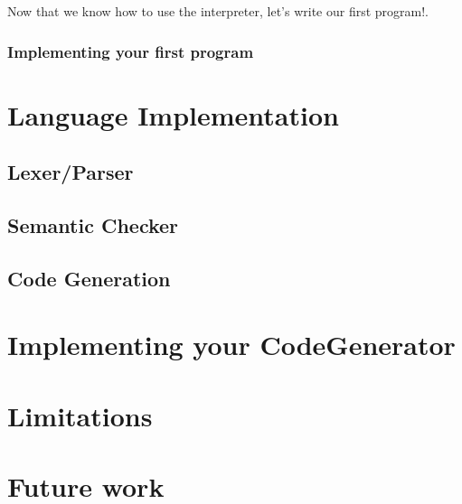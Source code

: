 Now that we know how to use the interpreter, let's write our first program!.

\subsubsection{Implementing your first program}



\section{Language Implementation}

\subsection{Lexer/Parser}

\subsection{Semantic Checker}

\subsection{Code Generation}

\section{Implementing your CodeGenerator}

\section{Limitations}

\section{Future work}